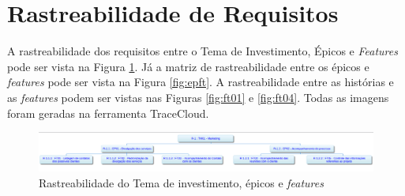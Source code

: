 \section[Rastreabilidade de Requisitos]{Rastreabilidade de Requisitos}
% 
% 
% 
% 
% 
% 
% 

A rastreabilidade dos requisitos entre o Tema de Investimento, Épicos e \textit{Features} pode ser vista na Figura \ref{fig:rastreabilidade}.
Já a matriz de rastreabilidade entre os épicos e \textit{features} pode ser vista na Figura \ref{fig:epft}. A rastreabilidade
entre as histórias e as \textit{features} podem ser vistas nas Figuras \ref{fig:ft01} e \ref{fig:ft04}. Todas as imagens foram geradas
na ferramenta TraceCloud. \footnotemark

\begin{figure}[!htb]
 \centering
 \includegraphics[scale= 0.5, angle=-90]{figuras/rastreabilidade_ferramenta.png}
 \caption{Rastreabilidade do Tema de investimento, épicos e \textit{features}}
 \label{fig:rastreabilidade}
\end{figure}

